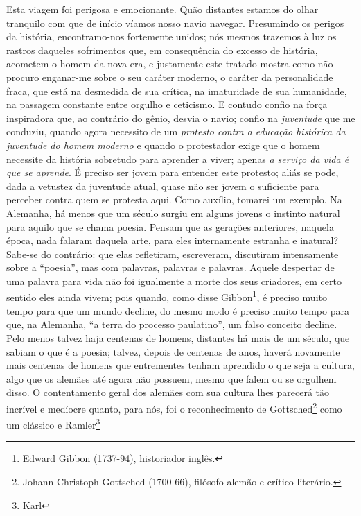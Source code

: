\begin{enumerate}
\begin{enumerate}
    Esta viagem foi perigosa e emocionante. Quão distantes estamos do
    olhar tranquilo com que de início víamos nosso navio navegar.
    Presumindo os perigos da história, encontramo-nos fortemente unidos;
    nós mesmos trazemos à luz os rastros daqueles sofrimentos que, em
    consequência do excesso de história, acometem o homem da nova era, e
    justamente este tratado mostra como não procuro enganar-me sobre o
    seu caráter moderno, o caráter da personalidade fraca, que está na
    desmedida de sua crítica, na imaturidade de sua humanidade, na
    passagem constante entre orgulho e ceticismo. E contudo confio na
    força inspiradora que, ao contrário do gênio, desvia o navio; confio
    na \emph{juventude} que me conduziu, quando agora necessito de um
    \emph{protesto contra a educação histórica da juventude do homem
    moderno} e quando o protestador exige que o homem necessite da
    história sobretudo para aprender a viver; apenas \emph{a serviço da
    vida é que se aprende}. É preciso ser jovem para entender este
    protesto; aliás se pode, dada a vetustez da juventude atual, quase
    não ser jovem o suficiente para perceber contra quem se protesta
    aqui. Como auxílio, tomarei um exemplo. Na Alemanha, há menos que um
    século surgiu em alguns jovens o instinto natural para aquilo que se
    chama poesia. Pensam que as gerações anteriores, naquela época, nada
    falaram daquela arte, para eles internamente estranha e inatural?
    Sabe-se do contrário: que elas refletiram, escreveram, discutiram
    intensamente sobre a ``poesia'', mas com palavras, palavras e
    palavras. Aquele despertar de uma palavra para vida não foi
    igualmente a morte dos seus criadores, em certo sentido eles ainda
    vivem; pois quando, como disse Gibbon\footnote{Edward Gibbon
      (1737-94), historiador inglês.}, é preciso muito tempo para que um
    mundo decline, do mesmo modo é preciso muito tempo para que, na
    Alemanha, ``a terra do processo paulatino'', um falso conceito
    decline. Pelo menos talvez haja centenas de homens, distantes há
    mais de um século, que sabiam o que é a poesia; talvez, depois de
    centenas de anos, haverá novamente mais centenas de homens que
    entrementes tenham aprendido o que seja a cultura, algo que os
    alemães até agora não possuem, mesmo que falem ou se orgulhem disso.
    O contentamento geral dos alemães com sua cultura lhes parecerá tão
    incrível e medíocre quanto, para nós, foi o reconhecimento de
    Gottsched\footnote{Johann Christoph Gottsched (1700-66), filósofo
      alemão e crítico literário.} como um clássico e Ramler\footnote{Karl
}
\end{enumerate}
\end{enumerate}
